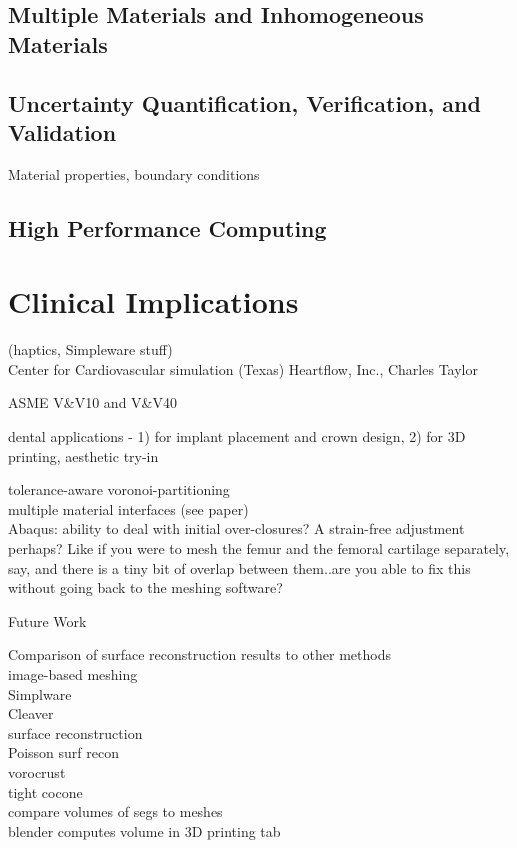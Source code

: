 \subsection{Multiple Materials and Inhomogeneous Materials}
\label{Multiple Materials and Inhomogeneous Materials}
\subsection{Uncertainty Quantification, Verification, and Validation}
\label{Uncertainty Quantification, Verification, and Validation}
Material properties, boundary conditions
\subsection{High Performance Computing}
\label{High Performance Computing}
\section{Clinical Implications}
\label{Clinical Implications}
(haptics, Simpleware stuff)\\
Center for Cardiovascular simulation (Texas)
Heartflow, Inc., Charles Taylor

ASME V\&V10 and V\&V40

dental applications - 1) for implant placement and crown design, 2) for 3D printing, aesthetic try-in 

tolerance-aware voronoi-partitioning \\
multiple material interfaces (see paper) \\

Abaqus: ability to deal with initial over-closures? A strain-free adjustment perhaps? Like if you were to mesh the femur and the femoral cartilage separately, say, and there is a tiny bit of overlap between them..are you able to fix this without going back to the meshing software?  

Future Work

Comparison of surface reconstruction results to other methods \\
image-based meshing \\
Simplware \\
Cleaver \\
surface reconstruction \\
Poisson surf recon \\
vorocrust \\
tight cocone \\
compare volumes of segs to meshes \\
blender computes volume in 3D printing tab \\

